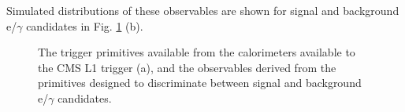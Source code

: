 Simulated distributions of these observables are shown for signal and background e/$\gamma$ candidates in Fig. \ref{fig:TriggerObservables} (b). 
\begin{figure}[tb!]
\caption{The trigger primitives available from the calorimeters available to the CMS L1 trigger (a), and the observables derived from the primitives designed to discriminate between signal and background e/$\gamma$ candidates.} 
\label{fig:TriggerObservables}
\end{figure}

